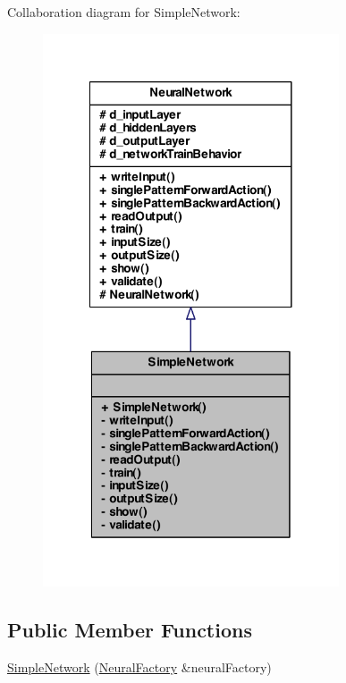 Collaboration diagram for SimpleNetwork:\nopagebreak
\begin{figure}[H]
\begin{center}
\leavevmode
\includegraphics[width=248pt]{class_simple_network__coll__graph}
\end{center}
\end{figure}
\subsection*{Public Member Functions}
\begin{DoxyCompactItemize}
\item 
\hyperlink{class_simple_network_a8371fd3be054537889207547e5e53e29}{SimpleNetwork} (\hyperlink{class_neural_factory}{NeuralFactory} \&neuralFactory)
\end{DoxyCompactItemize}
